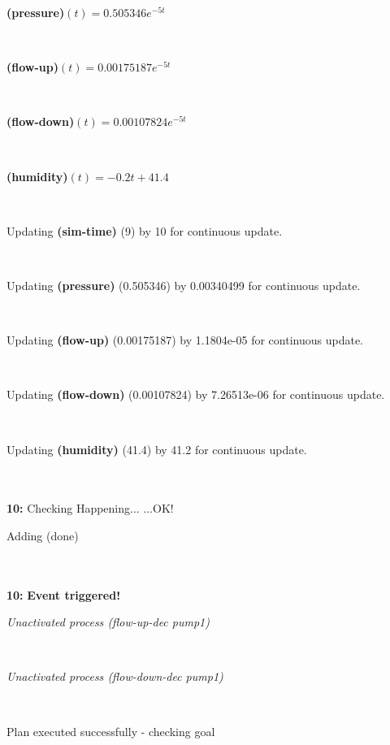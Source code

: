 \documentclass[a4paper,12pt]{article}
\newcommand{\atime}[1]{{\bf #1:}}
\newcommand{\action}[1]{{\sf #1}}
\newcommand{\exprn}[1]{{\sf #1}}
\newcommand{\fexprn}[1]{{\small {\bf #1}}}
\newcommand{\checkhappening}{Checking Happening... }
\newcommand{\eventtriggered}{{\bf Event triggered!}}
\newcommand{\listrow}[1]{\begin{minipage}[t]{11.5cm} #1 \end{minipage}}
\newcommand{\happeningOK}{...OK!}
\newcommand{\aprocessunactivated}[1]{\listrow{{\it Unactivated process #1} }}
\newcommand{\assignmentcts}[3]{\listrow{Updating \fexprn{#1} (#2) by #3 for continuous update.}}
\newcommand{\function}[2]{\listrow{\fexprn{#1}$(t) = #2$}}
\newcommand{\adding}[1]{\listrow{Adding \exprn{#1} }}
\begin{document}
\begin{tabbing}
 \> \function{(pressure)}{0.505346e^{ - 5t}}\\
 \> \function{(flow-up)}{0.00175187e^{ - 5t}}\\
 \> \function{(flow-down)}{0.00107824e^{ - 5t}}\\
 \> \function{(humidity)}{ - 0.2t + 41.4}\\
 \> \assignmentcts{(sim-time)}{9}{10}\\
 \> \assignmentcts{(pressure)}{0.505346}{0.00340499}\\
 \> \assignmentcts{(flow-up)}{0.00175187}{1.1804e-05}\\
 \> \assignmentcts{(flow-down)}{0.00107824}{7.26513e-06}\\
 \> \assignmentcts{(humidity)}{41.4}{41.2}\\
\\
\atime{10} \> \checkhappening\happeningOK\\
 \> \adding{(done)}\\
\\
 \atime{10} \> \eventtriggered \\
\> \aprocessunactivated{\action{(flow-up-dec pump1)}}\\
\> \aprocessunactivated{\action{(flow-down-dec pump1)}}\\
\end{tabbing}
Plan executed successfully - checking goal\\
\\
\end{document}
